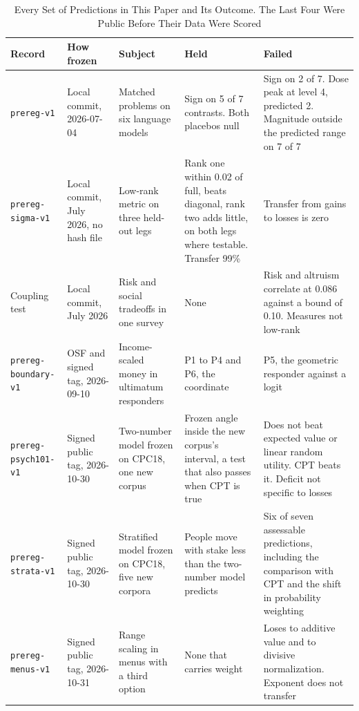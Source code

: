 \documentclass[journal]{IEEEtran}
\begin{document}
\begin{table}[!t]
\renewcommand{\arraystretch}{1.2}
\caption{Every Set of Predictions in This Paper and Its Outcome. The Last Four Were Public Before Their Data Were Scored}
\label{tab:scorecard}
\centering
\footnotesize
\begin{tabular}{@{}p{} p{} p{} p{} p{}@{}}
\toprule
\textbf{Record} & \textbf{How frozen} & \textbf{Subject} & \textbf{Held} & \textbf{Failed} \\
\midrule
\texttt{prereg-v1} & Local commit, 2026-07-04 & Matched problems on six language models & Sign on 5 of 7 contrasts. Both placebos null & Sign on 2 of 7. Dose peak at level 4, predicted 2. Magnitude outside the predicted range on 7 of 7 \\
\texttt{prereg-sigma-v1} & Local commit, July 2026, no hash file & Low-rank metric on three held-out legs & Rank one within 0.02 of full, beats diagonal, rank two adds little, on both legs where testable. Transfer 99\% & Transfer from gains to losses is zero \\
Coupling test & Local commit, July 2026 & Risk and social tradeoffs in one survey & None & Risk and altruism correlate at 0.086 against a bound of 0.10. Measures not low-rank \\
\texttt{prereg-boundary-v1} & OSF and signed tag, 2026-09-10 & Income-scaled money in ultimatum responders & P1 to P4 and P6, the coordinate & P5, the geometric responder against a logit \\
\texttt{prereg-psych101-v1} & Signed public tag, 2026-10-30 & Two-number model frozen on CPC18, one new corpus & Frozen angle inside the new corpus's interval, a test that also passes when CPT is true & Does not beat expected value or linear random utility. CPT beats it. Deficit not specific to losses \\
\texttt{prereg-strata-v1} & Signed public tag, 2026-10-30 & Stratified model frozen on CPC18, five new corpora & People move with stake less than the two-number model predicts & Six of seven assessable predictions, including the comparison with CPT and the shift in probability weighting \\
\texttt{prereg-menus-v1} & Signed public tag, 2026-10-31 & Range scaling in menus with a third option & None that carries weight & Loses to additive value and to divisive normalization. Exponent does not transfer \\
\bottomrule
\end{tabular}
\end{table}
\end{document}
